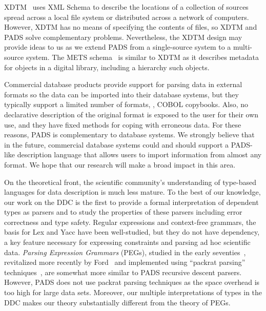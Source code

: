 XDTM~\cite{zhao+:sigmod05,xdtm} uses XML Schema to describe the
locations of a collection of sources spread across a local file system
or distributed across a network of computers.  However, XDTM has no
means of specifying the contents of files, so XDTM and PADS solve
complementary problems.  Nevertheless, the XDTM design may provide
ideas to us as we extend PADS from a single-source system to a
multi-source system. The METS schema~\cite{mets} is similar to XDTM as
it describes metadata for objects in a digital library, including a
hierarchy such objects.

Commercial database products provide support for
parsing data in external formats so the data can be imported into
their database systems, but they typically support a limited number of
formats, \eg{}, COBOL copybooks.  Also, no declarative description of the
original format is exposed to the user for their own use, and they
have fixed methods for coping with erroneous data.  For these reasons,
PADS is complementary to database systems.  We strongly believe that
in the future, commercial database systems could and should support a 
PADS-like description language that allows users to import information from
almost any format.  We hope that our research will make a broad
impact in this area.

On the theoretical front, the scientific community's understanding of
type-based languages for data description is much less mature.  To the
best of our knowledge, our work on the DDC is the first to provide a
formal interpretation of dependent types as parsers and to study the
properties of these parsers including error correctness and type
safety.  Regular expressions and context-free grammars, the basis for
Lex and Yacc have been well-studied, but they do not have dependency,
a key feature necessary for expressing constraints and parsing ad hoc
scientific data.  {\em Parsing Expression Grammars} (PEGs), studied in
the early seventies~\cite{birman+:parsing}, revitalized more recently
by Ford~\cite{ford:pegs} and implemented using ``packrat parsing''
techniques~\cite{ford:packrat,grimm:packrat}, are somewhat more
similar to PADS recursive descent parsers. However, PADS does not use
packrat parsing techniques as the space overhead is too high for large
data sets.  Moreover, our multiple interpretations of types
in the DDC makes our theory substantially different from the theory of
PEGs.



